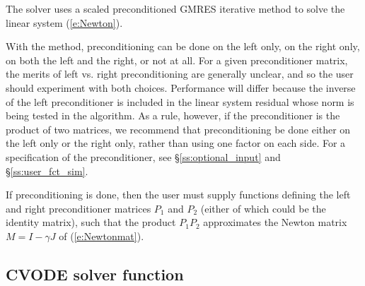 {
  The {\cvspgmr} solver uses a scaled preconditioned GMRES
  iterative method to solve the linear system (\ref{e:Newton}).

  With the {\spgmr} method, preconditioning 
  can be done on the left only, on the right only, on both the left and the right, 
  or not at all.  For a given preconditioner matrix, the merits of left vs. right
  preconditioning are generally unclear, and so the user should experiment
  with both choices.  Performance will differ because the inverse of the
  left preconditioner is included in the linear system residual whose
  norm is being tested in the {\spgmr} algorithm.  As a rule, however, if
  the preconditioner is the product of two matrices, we recommend that
  preconditioning be done either on the left only or the right only,
  rather than using one factor on each side. For a specification of the preconditioner,
  see \S\ref{ss:optional_input} and \S\ref{ss:user_fct_sim}.

  If preconditioning is done, then the user must supply functions defining the left and right 
  preconditioner matrices $P_1$ and $P_2$ (either of which could be the identity
  matrix), such that the product $P_1 P_2$ approximates the Newton matrix
  $M=I-\gamma J$ of (\ref{e:Newtonmat}).
}

\subsection{CVODE solver function}\label{sss:cvode}

